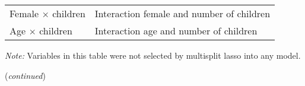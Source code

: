\documentclass[a4paper,12pt]{article}
\begin{document}
{\begin{threeparttable}
\begin{small}
\begin{tabular}{ll}
\vspace{0.14cm}Female $\times$ children &Interaction female and number of children\\
\vspace{0.14cm}Age $\times$ children &Interaction age and number of children\\
\hline
\hline
\end{tabular} 
\end{small}
 \begin{tablenotes}
  \begin{footnotesize}
     \item[~]\textit{Note:} \vspace{-0.35cm} Variables in this table were not selected by multisplit lasso into any model.
      \\    \item[~]\hfill (\textit{continued})
\singlespacing
  \end{footnotesize}
   \end{tablenotes}
  \end{threeparttable} 
\par}







\end{document}
